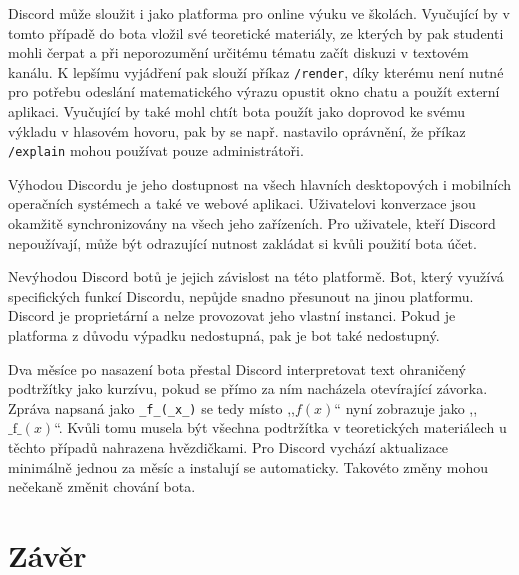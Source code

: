 \documentclass[FM]{tulthesis}
\begin{document}
	Discord může sloužit i jako platforma pro online výuku ve školách. Vyučující by v tomto případě do bota vložil své teoretické materiály, ze kterých by pak studenti mohli čerpat a při neporozumění určitému tématu začít diskuzi v textovém kanálu. K lepšímu vyjádření pak slouží příkaz \verb|/render|, díky kterému není nutné pro potřebu odeslání matematického výrazu opustit okno chatu a použít externí aplikaci. Vyučující by také mohl chtít bota použít jako doprovod ke svému výkladu v hlasovém hovoru, pak by se např. nastavilo oprávnění, že příkaz \verb|/explain| mohou používat pouze administrátoři.
	
	Výhodou Discordu je jeho dostupnost na všech hlavních desktopových i mobilních operačních systémech a také ve webové aplikaci. Uživatelovi konverzace jsou okamžitě synchronizovány na všech jeho zařízeních. Pro uživatele, kteří Discord nepoužívají, může být odrazující nutnost zakládat si kvůli použití bota účet.
	
	Nevýhodou Discord botů je jejich závislost na této platformě. Bot, který využívá specifických funkcí Discordu, nepůjde snadno přesunout na jinou platformu. Discord je proprietární a nelze provozovat jeho vlastní instanci. Pokud je platforma z důvodu výpadku nedostupná, pak je bot také nedostupný.
	
	Dva měsíce po nasazení bota přestal Discord interpretovat text ohraničený podtržítky jako kurzívu, pokud se přímo za ním nacházela otevírající závorka. Zpráva napsaná jako \verb|_f_(_x_)| se tedy místo ,,$f(x)$`` nyní zobrazuje jako ,,$\_\mathrm{f}\_(x)$``. Kvůli tomu musela být všechna podtržítka v teoretických materiálech u těchto případů nahrazena hvězdičkami. Pro Discord vychází aktualizace minimálně jednou za měsíc a instalují se automaticky. Takovéto změny mohou nečekaně změnit chování bota.

	
	\chapter{Závěr}
	
	
	
\end{document}
